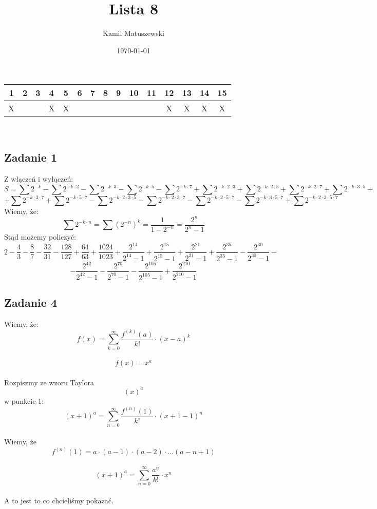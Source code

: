 \documentclass[a4paper]{article}
\title{Lista 8}
\author{Kamil Matuszewski}
\date{\today}
\begin{document}
\maketitle
\setlength{\parindent}{0.5ex}
\setlength{\parskip}{1.5ex}

\begin{center}
\begin{tabular}{|c *{13}{|c} |c|} & 2 & 3 & 4 & 5 & 6 & 7 & 8 & 9 & 10 & 11 & 12 & 13 & 14 & 15\\
\hline 
X & &  & X & X &  &  & &  &  &  & X & X & X & X\\
\hline
\end{tabular}\\
\end{center}

\subsection*{Zadanie 1}

Z włączeń i wyłączeń:\\

$$S = \sum 2^{-k} - \sum 2^{-k \cdot 2} - \sum 2^{-k \cdot 3} - \sum 2^{-k \cdot 5} - \sum 2^{-k \cdot 7} + \sum 2^{-k \cdot 2 \cdot 3} + \sum 2^{-k \cdot 2 \cdot 5} + \sum 2^{-k \cdot 2 \cdot 7} + \sum 2^{-k \cdot 3 \cdot 5} + $$ 
$$ + \sum 2^{-k \cdot 3 \cdot 7} + \sum 2^{-k \cdot 5 \cdot 7} - \sum 2^{-k \cdot 2 \cdot 3 \cdot 5}  - \sum 2^{-k \cdot 2 \cdot 3 \cdot 7}  - \sum 2^{-k \cdot 2 \cdot 5 \cdot 7}  - \sum 2^{-k \cdot 3 \cdot 5 \cdot 7} + \sum 2^{-k \cdot 2 \cdot 3 \cdot 5 \cdot 7}$$
Wiemy, że:
$$\sum 2^{-k\cdot n} = \sum (2^{-n})^k = \frac 1 {1 - 2^{-n}} = \frac {2^{n}} {2^{n}-1}$$ 
Stąd możemy policzyć:\\
$$
2 - \frac 4 3 - \frac 8 7 - \frac {32} {31} - \frac {128} {127} + \frac {64} {63} + \frac {1024} {1023} + \frac{2^{14}}{2^{14} -1} + \frac{2^{15}}{2^{15} -1} + \frac{2^{21}}{2^{21} -1} + \frac{2^{35}}{2^{35} -1} - \frac{2^{30}}{2^{30} -1} -$$ $$- \frac{2^{42}}{2^{42} -1} - \frac{2^{70}}{2^{70} -1} - \frac{2^{105}}{2^{105} -1} + \frac{2^{210}}{2^{210} -1}
$$

\clearpage
\subsection*{Zadanie 4}
Wiemy, że:\\
$$f(x) = \sum\limits_{k=0}^\infty \frac{f^{(k)}(a)}{k!}\cdot (x-a)^k$$\\
$$f(x)=x^a$$\\
Rozpiszmy ze wzoru Taylora $$(x)^a$$ w punkcie 1:\\
$$(x+1)^a = \sum\limits_{n=0}^\infty \frac{f^{(n)}(1)}{k!}\cdot (x+1-1)^n$$\\
Wiemy, że $$f^{(n)}(1) = a\cdot (a-1)\cdot (a-2)\cdot \ldots (a-n+1)$$\\
$$(x+1)^a = \sum\limits_{n=0}^\infty \frac{a^{\underline n}}{k!}\cdot x^n$$\\
A to jest to co chcieliśmy pokazać.
\clearpage
\end{document}
